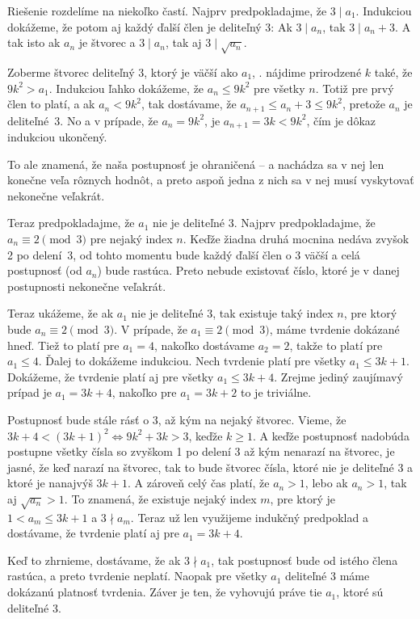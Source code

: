 {%
Riešenie rozdelíme na niekoľko častí.
Najprv predpokladajme, že $3\mid a_1$. Indukciou dokážeme, že potom aj každý ďalší člen je deliteľný 3: Ak $3\mid a_n$, tak ${3\mid a_n+3}$. A tak isto ak $a_n$ je štvorec a $3\mid a_n$, tak aj $3\mid \sqrt{a_n}$.

Zoberme štvorec deliteľný $3$, ktorý je väčší ako $a_1$, \tj. nájdime prirodzené $k$ také, že $9k^2>a_1$. Indukciou ľahko dokážeme, že $a_n\le 9k^2$ pre všetky $n$. Totiž pre prvý člen to platí, a ak $a_n<9k^2$, tak dostávame, že $a_{n+1}\le a_n+3\le 9k^2$, pretože $a_n$ je deliteľné~3. No a v prípade, že $a_n=9k^2$, je $a_{n+1}=3k<9k^2$, čím je dôkaz indukciou ukončený.

To ale znamená, že naša postupnosť je ohraničená -- a nachádza sa v nej len konečne veľa rôznych hodnôt, a preto aspoň jedna z nich sa v nej musí vyskytovať nekonečne veľakrát.

Teraz predpokladajme, že $a_1$ nie je deliteľné 3. Najprv predpokladajme, že $a_n\equiv 2\pmod{3}$ pre nejaký index $n$. Keďže žiadna druhá mocnina nedáva zvyšok 2 po delení~3, od tohto momentu bude každý ďalší člen o 3 väčší a celá postupnosť (od $a_n$)  bude rastúca. Preto nebude existovať číslo, ktoré je v danej postupnosti nekonečne veľakrát.

Teraz ukážeme, že ak $a_1$ nie je deliteľné 3, tak existuje taký index $n$, pre ktorý bude $a_n\equiv 2\pmod{3}$. V prípade, že $a_1\equiv 2\pmod{3}$, máme tvrdenie dokázané hneď. Tiež to platí pre $a_1=4$, nakoľko dostávame $a_2=2$, takže to platí pre $a_1\le 4$. Ďalej to dokážeme indukciou. Nech tvrdenie platí pre všetky $a_1\le 3k+1$. Dokážeme, že tvrdenie platí aj pre všetky $a_1\le 3k+4$. Zrejme jediný zaujímavý prípad je $a_1=3k+4$, nakoľko pre $a_1=3k+2$ to je triviálne.

Postupnosť bude stále rásť o 3, až kým  na nejaký štvorec. Vieme, že $3k+4<(3k+1)^2\Leftrightarrow 9k^2+3k>3$, keďže $k\ge 1$. A keďže postupnosť nadobúda postupne všetky čísla so zvyškom 1 po delení 3 až kým nenarazí na štvorec, je jasné, že keď narazí na štvorec, tak to bude štvorec čísla, ktoré nie je deliteľné 3 a ktoré je nanajvýš $3k+1$. A zároveň celý čas platí, že $a_n>1$, lebo ak $a_n>1$, tak aj $\sqrt{a_n}>1$. To znamená, že existuje nejaký index $m$, pre ktorý je $1<a_m\le 3k+1$ a $3\nmid a_m$. Teraz už len využijeme indukčný predpoklad a dostávame, že tvrdenie platí aj pre $a_1=3k+4$.

Keď to zhrnieme, dostávame, že ak $3\nmid a_1$, tak postupnosť bude od istého člena rastúca, a preto tvrdenie neplatí.
Naopak pre všetky $a_1$ deliteľné 3 máme dokázanú platnosť tvrdenia. Záver je ten, že vyhovujú práve tie $a_1$, ktoré sú deliteľné 3.}

